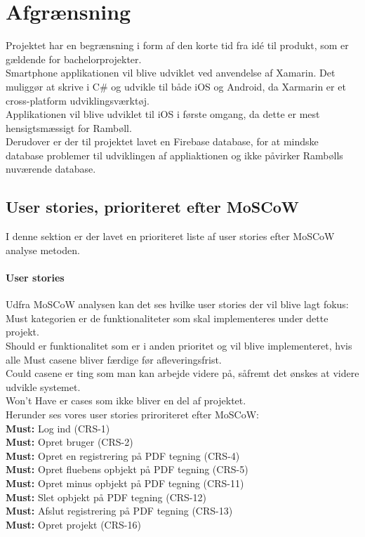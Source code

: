 \chapter{Afgrænsning}
Projektet har en begrænsning i form af den korte tid fra idé til produkt, som er gældende for bachelorprojekter.\\
Smartphone applikationen vil blive udviklet ved anvendelse af Xamarin. Det muliggør at skrive i C\# og udvikle til både iOS og Android, da Xarmarin er et cross-platform udviklingsværktøj. \\
Applikationen vil blive udviklet til iOS i første omgang, da dette er mest hensigtsmæssigt for Rambøll. \\
Derudover er der til projektet lavet en Firebase database, for at mindske database problemer til udviklingen af appliaktionen og ikke påvirker Rambølls nuværende database. \\

\section{User stories, prioriteret efter MoSCoW} \label{sec:MoSCoW}
I denne sektion er der lavet en prioriteret liste af user stories efter MoSCoW analyse metoden\cite{MoSCoW}.

\subsubsection{User stories}
Udfra MoSCoW analysen kan det ses hvilke user stories der vil blive lagt fokus: \\
Must kategorien er de funktionaliteter som skal implementeres under dette projekt.\\ 
Should er funktionalitet som er i anden prioritet og vil blive implementeret, hvis alle Must casene bliver færdige før afleveringsfrist.\\ 
Could casene er ting som man kan arbejde videre på, såfremt det ønskes at videre udvikle systemet. \\
Won't Have er cases som ikke bliver en del af projektet.\\

Herunder ses vores user stories priroriteret efter MoSCoW: \\
\textbf{Must:} Log ind (CRS-1) \\
\textbf{Must:} Opret bruger (CRS-2) \\
\textbf{Must:} Opret en registrering på PDF tegning (CRS-4) \\
\textbf{Must:} Opret fluebens opbjekt på PDF tegning (CRS-5) \\
\textbf{Must:} Opret minus opbjekt på PDF tegning (CRS-11) \\
\textbf{Must:} Slet opbjekt på PDF tegning (CRS-12) \\
\textbf{Must:} Afslut registrering på PDF tegning (CRS-13) \\
\textbf{Must:} Opret projekt (CRS-16) \\ \\

